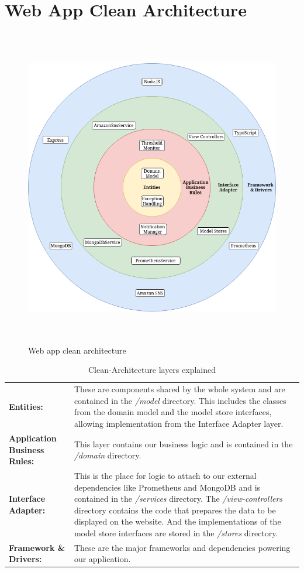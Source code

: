 \section{Web App Clean Architecture}
\begin{figure}[H]
  \centering
  \includegraphics[height=14cm]{resources/clean_architecture.drawio.png}
  \caption{Web app clean architecture}
  \label{fig:web-app-architecture}
\end{figure}

\begin{table}[H]
  \begin{tabular*}{\textwidth}{p{3cm} | p{11cm}}
    \textbf{Entities:} &
      These are components shared by the whole system and are contained
      in the \textit{/model} directory.
      This includes the classes from the domain model and the model store interfaces,
      allowing implementation from the Interface Adapter layer. \bigskip \\
    \textbf{Application Business Rules:} &
      This layer contains our business logic and is contained in
      the \textit{/domain} directory. \bigskip \\
    \textbf{Interface Adapter:} &
      This is the place for logic to attach to our external dependencies
      like Prometheus and MongoDB and is contained in the \textit{/services} directory.
      The \textit{/view-controllers} directory contains the code
      that prepares the data to be displayed on the website.
      And the implementations of the model store interfaces are stored
      in the \textit{/stores} directory. \bigskip \\
    \textbf{Framework \& Drivers:} &
      These are the major frameworks and dependencies powering our application. \\
  \end{tabular*}
  \caption{Clean-Architecture layers explained}
  \label{tab:clean-architecture-layers-explained}
\end{table}

